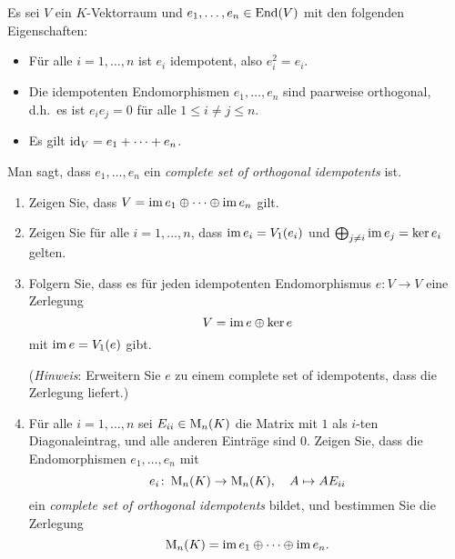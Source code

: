 \begin{question}
  Es sei $V$ ein $K$-Vektorraum und $e_1, \dotsc, e_n \in \operatorname{End}(V)$ mit den folgenden Eigenschaften:
  \begin{itemize}
    \item
      Für alle $i = 1, \dotsc, n$ ist $e_i$ idempotent, also $e_i^2 = e_i$.
    \item
      Die idempotenten Endomorphismen $e_1, \dotsc, e_n$ sind paarweise orthogonal, d.h.\ es ist $e_i e_j = 0$ für alle $1 \leq i \neq j \leq n$.
    \item
      Es gilt $\operatorname{id}_V = e_1 + \dotsb + e_n$.
  \end{itemize}
  Man sagt, dass $e_1, \dotsc, e_n$ ein \emph{complete set of orthogonal idempotents} ist.
  \begin{enumerate}[leftmargin=*]
    \item
      Zeigen Sie, dass $V = \operatorname{im} e_1 \oplus \dotsb \oplus \operatorname{im} e_n$ gilt.
    \item
      Zeigen Sie für alle $i = 1, \dotsc, n$, dass $\operatorname{im} e_i = V_1(e_i)$ und $\bigoplus_{j \neq i} \operatorname{im} e_j = \ker e_i$ gelten.
    \item
      Folgern Sie, dass es für jeden idempotenten Endomorphismus $e \colon V \to V$ eine Zerlegung
      \[
        V = \operatorname{im} e \oplus \ker e
      \]
      mit $\operatorname{im} e = V_1(e)$ gibt.
      
      (\emph{Hinweis}:
       Erweitern Sie $e$ zu einem complete set of idempotents, dass die Zerlegung liefert.)
    \item
      Für alle $i = 1, \dotsc, n$ sei $E_{ii} \in \operatorname{M}_n(K)$ die Matrix mit $1$ als $i$-ten Diagonaleintrag, und alle anderen Einträge sind $0$.
      Zeigen Sie, dass die Endomorphismen $e_1, \dotsc, e_n$ mit
      \[
        e_i \colon \operatorname{M}_n(K) \to \operatorname{M}_n(K),
        \quad
        A \mapsto A E_{ii}
      \]
      ein \emph{complete set of orthogonal idempotents} bildet, und bestimmen Sie die Zerlegung
      \[
        \operatorname{M}_n(K) = \operatorname{im} e_1 \oplus \dotsb \oplus \operatorname{im} e_n.
      \]
  \end{enumerate}
\end{question}


